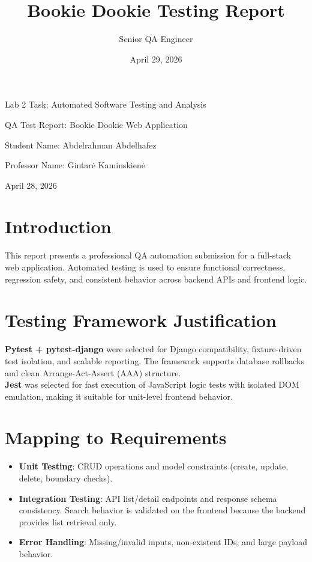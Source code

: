 \documentclass[11pt]{article}
\title{Bookie Dookie Testing Report}
\author{Senior QA Engineer}
\date{April 29, 2026}
\begin{document}
\begin{titlepage}
\centering
{\Large Lab 2 Task: Automated Software Testing and Analysis}\par
\vspace{0.8cm}
{\Large QA Test Report: Bookie Dookie Web Application}\par
\vspace{1.2cm}
{\large Student Name: Abdelrahman Abdelhafez}\par
\vspace{0.4cm}
{\large Professor Name: Gintarė Kaminskienė}\par
\vspace{0.8cm}
{\large April 28, 2026}\par
\vfill
\thispagestyle{empty}
\end{titlepage}

\tableofcontents
\newpage

\section{Introduction}
This report presents a professional QA automation submission for a full-stack web application. Automated testing is used to ensure functional correctness, regression safety, and consistent behavior across backend APIs and frontend logic.

\section{Testing Framework Justification}
\textbf{Pytest + pytest-django} were selected for Django compatibility, fixture-driven test isolation, and scalable reporting. The framework supports database rollbacks and clean Arrange-Act-Assert (AAA) structure.\\
\textbf{Jest} was selected for fast execution of JavaScript logic tests with isolated DOM emulation, making it suitable for unit-level frontend behavior.

\section{Mapping to Requirements}
\begin{itemize}
    \item \textbf{Unit Testing}: CRUD operations and model constraints (create, update, delete, boundary checks).
    \item \textbf{Integration Testing}: API list/detail endpoints and response schema consistency. Search behavior is validated on the frontend because the backend provides list retrieval only.
    \item \textbf{Error Handling}: Missing/invalid inputs, non-existent IDs, and large payload behavior.
\end{itemize}
\end{document}

